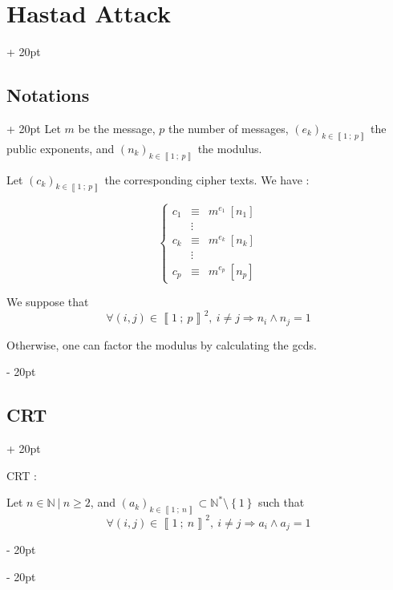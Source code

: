 \documentclass[a4paper, 12pt, twoside]{article}
\newcommand{\N}{\mathbb{N}} %
\newcommand{\nset}[2]{\left\llbracket #1\ ;\ #2 \right\rrbracket}
\newcommand{\set}[1]{\left\{ #1 \right\}}
\renewcommand{\ge}{\geqslant}
\newcommand{\ind}[1][20pt]{\advance\leftskip + #1}
\newcommand{\deind}[1][20pt]{\advance\leftskip - #1}
\newenvironment{indt}[2][20pt]{#2 \par \ind[#1]}{\par \deind} %
\begin{document}
    \vspace{12pt}
    
    \begin{indt}{\section{Hastad Attack}}
        \begin{indt}{\subsection{Notations}}
            Let $m$ be the message, $p$ the number of messages, $(e_k)_{k \in \nset 1 p}$ the public exponents, and $(n_k)_{k \in \nset 1 p}$ the modulus.
            
            Let $(c_k)_{k \in \nset 1 p}$ the corresponding cipher texts. We have :
            
            \[
                \left\{
                \begin{array}{rcl}
                    c_1 &\equiv& m^{e_1}\ [n_1]
                    \\
                        &\vdots
                    \\
                    c_k &\equiv& m^{e_k}\ [n_k]
                    \\
                        &\vdots
                    \\
                    c_p &\equiv& m^{e_p}\ [n_p]
                \end{array}
                \right.
            \]
            
            We suppose that
            \[
                \forall (i, j) \in \nset 1 p ^2,\
                i \neq j \Rightarrow n_i \wedge n_j = 1
            \]
            
            Otherwise, one can factor the modulus by calculating the gcds.
        \end{indt}

        \begin{indt}{\subsection{CRT}}
            \begin{pseudocode}
                CRT :
            
                Let $n \in \N\ |\ n \ge 2$, and $(a_k)_{k \in \nset 1 n} \subset \N^* \setminus \set 1$ such that
                \[
                    \forall (i, j) \in \nset 1 n ^2,\
                    i \neq j \Rightarrow a_i \wedge a_j = 1
                \]
            

\end{pseudocode}
\end{indt}
\end{indt}
\end{document}
